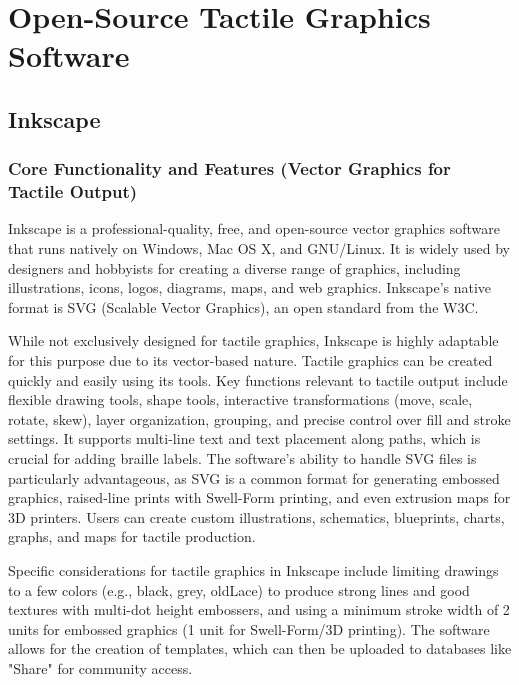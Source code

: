 \section{Open-Source Tactile Graphics Software}

\subsection{Inkscape}

\subsubsection{Core Functionality and Features (Vector Graphics for Tactile Output)}

Inkscape is a professional-quality, free, and open-source vector graphics software that runs natively on Windows, Mac OS X, and GNU/Linux.\cite{GetBraille,BlindHelpDBT} It is widely used by designers and hobbyists for creating a diverse range of graphics, including illustrations, icons, logos, diagrams, maps, and web graphics.\cite{BlindHelpDBT} Inkscape's native format is SVG (Scalable Vector Graphics), an open standard from the W3C.\cite{BlindHelpDBT}

While not exclusively designed for tactile graphics, Inkscape is highly adaptable for this purpose due to its vector-based nature. Tactile graphics can be created quickly and easily using its tools.\cite{GetBraille} Key functions relevant to tactile output include flexible drawing tools, shape tools, interactive transformations (move, scale, rotate, skew), layer organization, grouping, and precise control over fill and stroke settings.\cite{DuxburyFAQ13} It supports multi-line text and text placement along paths, which is crucial for adding braille labels.\cite{DuxburyFAQ13} The software's ability to handle SVG files is particularly advantageous, as SVG is a common format for generating embossed graphics, raised-line prints with Swell-Form printing, and even extrusion maps for 3D printers.\cite{ProBlindCreate} Users can create custom illustrations, schematics, blueprints, charts, graphs, and maps for tactile production.\cite{ProBlindCreate}

Specific considerations for tactile graphics in Inkscape include limiting drawings to a few colors (e.g., black, grey, oldLace) to produce strong lines and good textures with multi-dot height embossers, and using a minimum stroke width of 2 units for embossed graphics (1 unit for Swell-Form/3D printing).\cite{ProBlindCreate} The software allows for the creation of templates, which can then be uploaded to databases like "Share" for community access.\cite{GetBraille}

